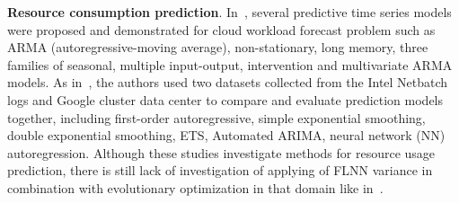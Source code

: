 \documentclass[runningheads]{llncs}
\begin{document}
%


\textbf{Resource consumption prediction}. 
In~\cite{ref_hipel}, several predictive time series models were proposed and demonstrated for cloud workload forecast problem such as ARMA (autoregressive-moving average), non-stationary, long memory, three families of seasonal, multiple input-output, intervention and multivariate ARMA models. As in~\cite{ref_vazquez}, the authors used two datasets collected from the Intel Netbatch logs and Google cluster data center to compare and evaluate prediction models together, including first-order autoregressive, simple exponential smoothing, double exponential smoothing, ETS, Automated ARIMA, neural network (NN) autoregression. Although these studies investigate methods for resource usage prediction, there is still lack of investigation of applying of FLNN variance in combination with evolutionary optimization in that domain like in~\cite{ref_thieu}.
\end{document}
